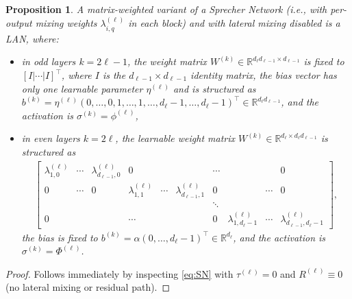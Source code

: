 \documentclass{article}
\theoremstyle{plain}
\newtheorem{prop}{Proposition}
\theoremstyle{definition}
\theoremstyle{remark}
\begin{document}
\begin{prop} \label{prop:SNareLAN}
    A matrix-weighted variant of a Sprecher Network (i.e., with per-output mixing weights $\lambda^{(\ell)}_{i,q}$ in each block) and with lateral mixing disabled is a LAN, where:
    \begin{itemize}
        \item in odd layers $k = 2\ell - 1$, the weight matrix $W^{(k)} \in \mathbb{R}^{d_\ell d_{\ell-1} \times d_{\ell-1}}$ is fixed to  $[I | \cdots | I]^\top$, where $I$ is the $d_{\ell-1} \times d_{\ell-1}$ identity matrix, the bias vector has only one learnable parameter $\eta^{(\ell)}$ and is structured as $b^{(k)} = \eta^{(\ell)}(0,\ldots,0, 1, \ldots, 1, \ldots, d_{\ell}-1, \ldots, d_{\ell}-1)^\top \in \mathbb{R}^{d_\ell d_{\ell-1}}$, and the activation is $\sigma^{(k)} = \phi^{(\ell)}$, 
        \item in even layers $k = 2\ell $, the learnable weight matrix $W^{(k)} \in \mathbb{R}^{d_\ell \times d_\ell d_{\ell-1}}$ is structured as
        \begin{align*}
            \begin{bmatrix}
                \lambda_{1,0}^{(\ell)} & \cdots & \lambda_{d_{\ell-1},0}^{(\ell)} & 0 &&& \cdots &&&0 \\
               0  &\cdots & 0 & \lambda_{1,1}^{(\ell)} & \cdots & \lambda_{d_{\ell-1},1}^{(\ell)} & 0 && \cdots & 0 \\
               &&&&&& \ddots \\
               0 &&&\cdots &&&0&\lambda_{1,d_\ell-1}^{(\ell)} & \cdots & \lambda_{d_{\ell-1},d_\ell-1}^{(\ell)}
            \end{bmatrix},
        \end{align*} 
        the bias is fixed to $b^{(k)} = \alpha(0,\ldots, d_\ell-1)^\top \in \mathbb{R}^{d_\ell}$, and the activation is $\sigma^{(k)} = \Phi^{(\ell)}$. 
    \end{itemize}
\end{prop}
\begin{proof}
    Follows immediately by inspecting \eqref{eq:SN} with $\tau^{(\ell)} = 0$ and $R^{(\ell)}\equiv 0$ (no lateral mixing or residual path).
\end{proof}
\end{document}
